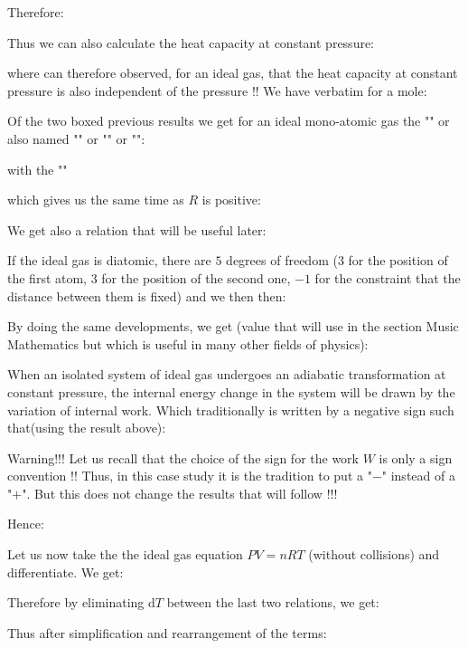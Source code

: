 	Therefore:
	
	Thus we can also calculate the heat capacity at constant pressure:
	
	where can therefore observed, for an ideal gas, that the heat capacity at constant pressure is also independent of the pressure !! We have verbatim for a mole:
	
	Of the two boxed previous results we get for an ideal mono-atomic gas the "" or also named "" or "" or "":
	
	with the ""
	
	which gives us the same time as $R$ is positive:
	
	We get also a relation that will be useful later:
	
	If the ideal gas is diatomic, there are $5$ degrees of freedom ($3$ for the position of the first atom, $3$ for the position of the second one, $-1$ for the constraint that the distance between them is fixed) and we then then:
	
	By doing the same developments, we get (value that will use in the section Music Mathematics but which is useful in many other fields of physics):
	
	When an isolated system of ideal gas undergoes an adiabatic transformation at constant pressure, the internal energy change in the system will be drawn by the variation of internal work. Which traditionally is written by a negative sign such that(using the result above):
	
	\begin{tcolorbox}[title=Remark,colframe=black,arc=10pt]
	Warning!!! Let us recall that the choice of the sign for the work $W$ is only a sign convention !! Thus, in this case study it is the tradition to put a "$-$" instead of a "$+$". But this does not change the results that will follow !!!
	\end{tcolorbox}
	Hence:
	
	Let us now take the the ideal gas equation $PV=nRT$ (without collisions) and differentiate. We get:
	
	Therefore by eliminating $\mathrm{d}T$ between the last two relations, we get:
	
	Thus after simplification and rearrangement of the terms:
	
